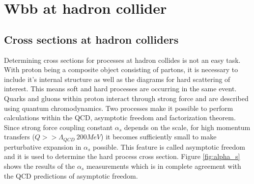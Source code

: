 
\section{Wbb at hadron collider}



\subsection{Cross sections at hadron colliders}

	Determining cross sections for processes at hadron collides is not an easy task. With proton being a composite object consisting of partons, it is necessary to include it's internal structure as well as the diagrams for hard scattering of interest. This means soft and hard processes are occurring in the same event. Quarks and gluons within proton interact through strong force and are described using quantum chromodynamics. Two processes make it possible to perform calculations within the QCD, asymptotic freedom and factorization theorem. Since strong force coupling constant $\alpha_s$ depends on the scale, for high momentum transfers ($Q >> \Lambda_{QCD}~200MeV$) it becomes sufficiently small to make perturbative expansion in $\alpha_s$ possible. This feature is called asymptotic freedom and it is used to determine the hard process cross section. Figure \ref{fig:alpha_s} shows the results of the $\alpha_s$ measurements which is in complete agreement with the QCD predictions of asymptotic freedom. \\
